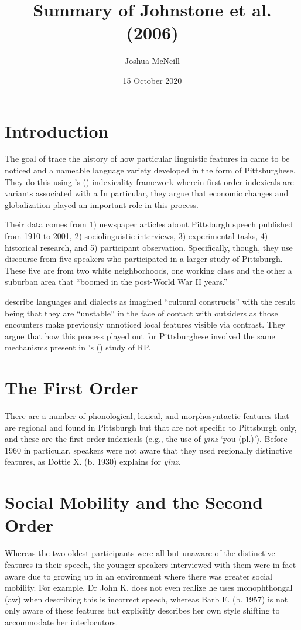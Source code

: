 \documentclass{article}
\title{Summary of Johnstone et al. (2006)}
\author{Joshua McNeill}
\date{15 October 2020}
\newcommand{\lexi}[1]{\textit{#1}}
\newcommand{\gloss}[1]{`#1'}
\begin{document}
  \maketitle
  \section{Introduction}
    The goal of \textcite{johnstone_mobility_2006} trace the history of how particular linguistic features in came to be noticed and a nameable language variety developed in the form of Pittsburghese.
    They do this using \citeauthor{silverstein_indexical_2003}'s (\citeyear{silverstein_indexical_2003}) indexicality framework wherein first order indexicals are variants associated with a %
    In particular, they argue that economic changes and globalization played an important role in this process.

    Their data comes from 1) newspaper articles about Pittsburgh speech published from 1910 to 2001, 2) sociolinguistic interviews, 3) experimental tasks, 4) historical research, and 5) participant observation.
    Specifically, though, they use discourse from five speakers who participated in a larger study of Pittsburgh.
    These five are from two white neighborhoods, one working class and the other a suburban area that ``boomed in the post-World War II years.''

    \textcite{johnstone_mobility_2006} describe languages and dialects as imagined ``cultural constructs'' with the result being that they are ``unstable'' in the face of contact with outsiders as those encounters make previously unnoticed local features visible via contrast.
    They argue that how this process played out for Pittsburghese involved the same mechanisms present in \citeauthor{agha_social_2003}'s (\citeyear{agha_social_2003}) study of RP.

  \section{The First Order}
    There are a number of phonological, lexical, and morphosyntactic features that are regional and found in Pittsburgh but that are not specific to Pittsburgh only, and these are the first order indexicals (e.g., the use of \lexi{yinz} \gloss{you (pl.)}).
    Before 1960 in particular, speakers were not aware that they used regionally distinctive features, as Dottie X. (b. 1930) explains for \lexi{yinz}.

  \section{Social Mobility and the Second Order}
    Whereas the two oldest participants were all but unaware of the distinctive features in their speech, the younger speakers interviewed with them were in fact aware due to growing up in an environment where there was greater social mobility.
    For example, Dr John K. does not even realize he uses monophthongal (aw) when describing this is incorrect speech, whereas Barb E. (b. 1957) is not only aware of these features but explicitly describes her own style shifting to accommodate her interlocutors.
\end{document}
